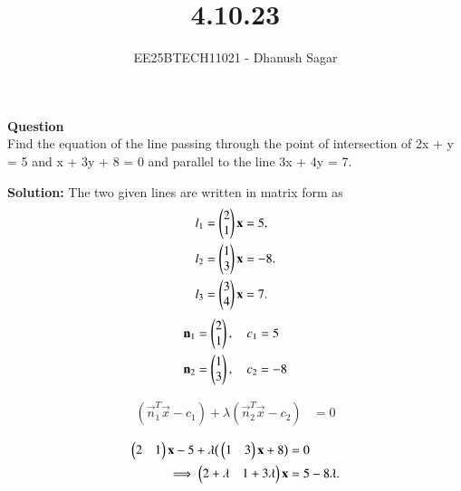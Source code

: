 \documentclass[journal]{IEEEtran}
\begin{document}



\title{4.10.23}
\author{EE25BTECH11021 - Dhanush Sagar}

{\let\newpage\relax\maketitle}

\renewcommand{\thefigure}{\theenumi}
\renewcommand{\thetable}{\theenumi}
\setlength{\intextsep}{10pt} %
\renewcommand{\thetable}{\theenumi}
\textbf{Question} \\
Find the equation of the line passing through the point of intersection of 2x + y = 5
and x + 3y + 8 = 0 and parallel to the line 3x + 4y = 7.



\bigskip
\noindent \textbf{Solution:}
The two given lines are written in matrix form as
\begin{align}
l_1 = \begin{pmatrix}2 \\ 1\end{pmatrix}\mathbf{x} &= 5, \\
l_2 = \begin{pmatrix}1 \\ 3\end{pmatrix}\mathbf{x} &= -8.\\
l_3 = \begin{pmatrix}3 \\ 4\end{pmatrix}\mathbf{x} &= 7. \\
\end{align}
\begin{align}
\mathbf{n}_1 &= \begin{pmatrix}2\\1\end{pmatrix}, \quad c_1=5 \\
\mathbf{n}_2 &= \begin{pmatrix}1\\3\end{pmatrix}, \quad c_2=-8
\end{align}

\begin{align}
(\vec{n}_1^T\vec{x}-c_1) + \lambda(\vec{n}_2^T\vec{x}-c_2) &= 0
\end{align}

\begin{align}
\begin{pmatrix}2 & 1\end{pmatrix}\mathbf{x}-5 + \lambda\big(\begin{pmatrix}1 & 3\end{pmatrix}\mathbf{x}+8\big) &= 0 \\
\implies \begin{pmatrix}2+\lambda & 1+3\lambda\end{pmatrix}\mathbf{x} &= 5 - 8\lambda.  
\end{align}
\end{document}

